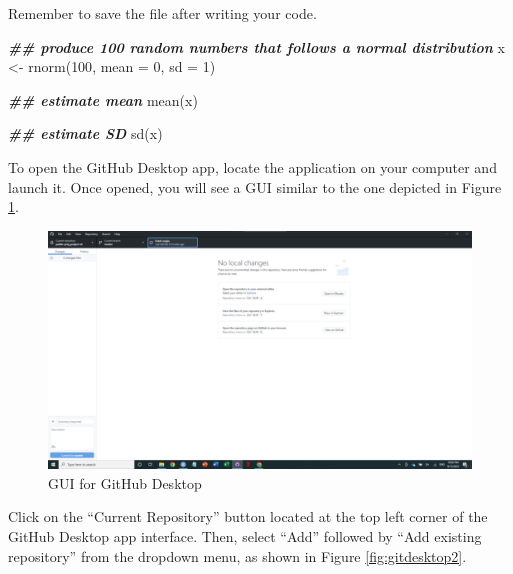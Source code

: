 \documentclass[
]{article}
\newenvironment{Shaded}{\begin{snugshade}}{\end{snugshade}}
\newcommand{\AttributeTok}[1]{\textcolor[rgb]{0.77,0.63,0.00}{#1}}
\newcommand{\DecValTok}[1]{\textcolor[rgb]{0.00,0.00,0.81}{#1}}
\newcommand{\DocumentationTok}[1]{\textcolor[rgb]{0.56,0.35,0.01}{\textbf{\textit{#1}}}}
\newcommand{\FunctionTok}[1]{\textcolor[rgb]{0.00,0.00,0.00}{#1}}
\newcommand{\NormalTok}[1]{#1}
\newcommand{\OtherTok}[1]{\textcolor[rgb]{0.56,0.35,0.01}{#1}}
\begin{document}
Remember to save the file after writing your code.

\begin{Shaded}
\begin{Highlighting}[]
\DocumentationTok{\#\# produce 100 random numbers that follows a normal distribution}
\NormalTok{x }\OtherTok{\textless{}{-}} \FunctionTok{rnorm}\NormalTok{(}\DecValTok{100}\NormalTok{, }\AttributeTok{mean =} \DecValTok{0}\NormalTok{, }\AttributeTok{sd =} \DecValTok{1}\NormalTok{)}

\DocumentationTok{\#\# estimate mean}
\FunctionTok{mean}\NormalTok{(x)}

\DocumentationTok{\#\# estimate SD}
\FunctionTok{sd}\NormalTok{(x)}
\end{Highlighting}
\end{Shaded}

To open the GitHub Desktop app, locate the application on your computer and launch it. Once opened, you will see a GUI similar to the one depicted in Figure \ref{fig:gitdesktop1}.

\begin{figure}

{\centering \includegraphics[width=61.11in]{image/git_image02} 

}

\caption{GUI for GitHub Desktop}\label{fig:gitdesktop1}
\end{figure}

Click on the ``Current Repository'' button located at the top left corner of the GitHub Desktop app interface. Then, select ``Add'' followed by ``Add existing repository'' from the dropdown menu, as shown in Figure \ref{fig:gitdesktop2}.
\end{document}
